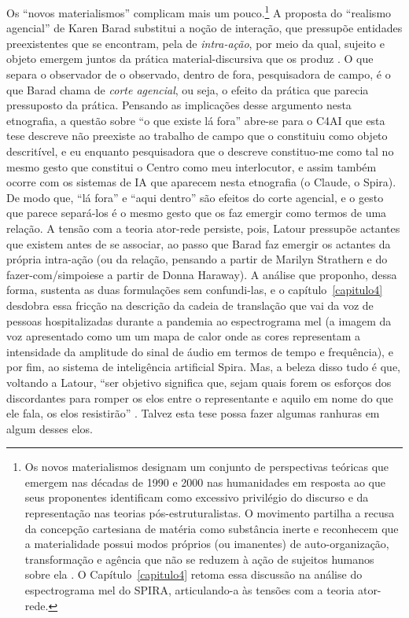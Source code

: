 Os \enquote{novos materialismos} complicam mais um pouco.\footnote{Os novos materialismos designam um conjunto de perspectivas teóricas que emergem nas décadas de 1990 e 2000 nas humanidades em resposta ao que seus proponentes identificam como excessivo privilégio do discurso e da representação nas teorias pós-estruturalistas. O movimento partilha a recusa da concepção cartesiana de matéria como substância inerte e reconhecem que a materialidade possui modos próprios (ou imanentes) de auto-organização, transformação e agência que não se reduzem à ação de sujeitos humanos sobre ela \parencite[pp.~7--10]{CooleFrost2010}. O Capítulo~\ref{capitulo4} retoma essa discussão na análise do espectrograma mel do SPIRA, articulando-a às tensões com a teoria ator-rede.} A proposta do \enquote{realismo agencial} de Karen Barad substitui a noção de interação, que pressupõe entidades preexistentes que se encontram, pela de \textit{intra-ação}, por meio da qual, sujeito e objeto emergem juntos da prática material-discursiva que os produz \parencite[pp.~54--56]{DolphijnTuin2012}. O que separa o observador de o observado, dentro de fora, pesquisadora de campo, é o que Barad chama de \textit{corte agencial}, ou seja, o efeito da prática que parecia pressuposto da prática. Pensando as implicações desse argumento nesta etnografia, a questão sobre \enquote{o que existe lá fora} abre-se para o C4AI que esta tese descreve não preexiste ao trabalho de campo que o constituiu como objeto descritível, e eu enquanto pesquisadora que o descreve constituo-me como tal no mesmo gesto que constitui o Centro como meu interlocutor, e assim também ocorre com os sistemas de IA que aparecem nesta etnografia (o Claude, o Spira). De modo que, \enquote{lá fora} e \enquote{aqui dentro} são efeitos do corte agencial, e o gesto que parece separá-los é o mesmo gesto que os faz emergir como termos de uma relação. A tensão com a teoria ator-rede persiste, pois, Latour pressupõe actantes que existem antes de se associar, ao passo que Barad faz emergir os actantes da própria intra-ação (ou da relação, pensando a partir de Marilyn Strathern e do fazer-com/simpoiese a partir de Donna Haraway). A análise que proponho, dessa forma, sustenta as duas formulações sem confundi-las, e o capítulo~\ref{capitulo4} desdobra essa fricção na descrição da cadeia de translação que vai da voz de pessoas hospitalizadas durante a pandemia ao espectrograma mel (a imagem da voz apresentado como um um mapa de calor onde as cores representam a intensidade da amplitude do sinal de áudio em termos de tempo e frequência), e por fim, ao sistema de inteligência artificial Spira. Mas, a beleza disso tudo é que, voltando a Latour, \enquote{ser objetivo significa que, sejam quais forem os esforços dos discordantes para romper os elos entre o representante e aquilo em nome do que ele fala, os elos resistirão} \parencite[p.~118]{Latour2011CienciaEmAcao}. Talvez esta tese possa fazer algumas ranhuras em algum desses elos. 

